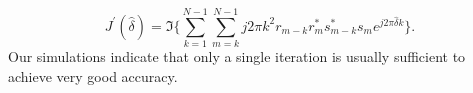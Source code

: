 \begin{equation}
    \label{eq:derivative of delta}
    J^\prime(\hat{\delta}) = \Im\bigg\{\sum_{k=1}^{N-1}{\sum_{m=k}^{N-1}{j2\pi k^2r_{m-k}r_m^{*}s_{m-k}^{*}s_m}e^{j2\pi\hat{\delta}k}}\bigg\}.
    \end{equation}
Our simulations indicate that only a single iteration is usually sufficient to achieve very good accuracy.


